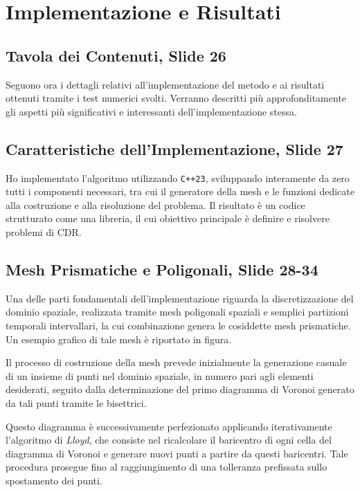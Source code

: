 \documentclass[12pt]{article}
\begin{document}
    \newpage
    \section{Implementazione e Risultati}

    \subsection{Tavola dei Contenuti, Slide 26}

    Seguono ora i dettagli relativi all'implementazione del metodo e ai risultati ottenuti tramite i test numerici svolti. Verranno descritti più approfonditamente gli aspetti più significativi e interessanti dell'implementazione stessa.

    \subsection{Caratteristiche dell'Implementazione, Slide 27}

    Ho implementato l'algoritmo utilizzando \lstinline{C++23}, sviluppando interamente da zero tutti i componenti necessari, tra cui il generatore della mesh e le funzioni dedicate alla costruzione e alla risoluzione del problema. Il risultato è un codice strutturato come una libreria, il cui obiettivo principale è definire e risolvere problemi di CDR.

    \subsection{Mesh Prismatiche e Poligonali, Slide 28-34}

    Una delle parti fondamentali dell'implementazione riguarda la discretizzazione del dominio spaziale, realizzata tramite mesh poligonali spaziali e semplici partizioni temporali intervallari, la cui combinazione genera le cosiddette mesh prismatiche. Un esempio grafico di tale mesh è riportato in figura.

    Il processo di costruzione della mesh prevede inizialmente la generazione casuale di un insieme di punti nel dominio spaziale, in numero pari agli elementi desiderati, seguito dalla determinazione del primo diagramma di Voronoi generato da tali punti tramite le bisettrici.

    Questo diagramma è successivamente perfezionato applicando iterativamente l'algoritmo di \textit{Lloyd}, che consiste nel ricalcolare il baricentro di ogni cella del diagramma di Voronoi e generare nuovi punti a partire da questi baricentri. Tale procedura prosegue fino al raggiungimento di una tolleranza prefissata sullo spostamento dei punti.
\end{document}
